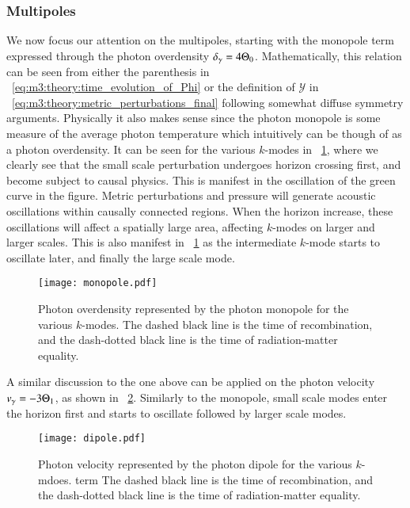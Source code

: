 \subsubsection{Multipoles}
    We now focus our attention on the multipoles, starting with the monopole term expressed through the photon overdensity $\delta_\gamma = 4\Theta_0$. Mathematically, this relation can be seen  from either the parenthesis in ~\cref{eq:m3:theory:time_evolution_of_Phi} or the definition of $\mathcal{Y}$ in ~\cref{eq:m3:theory:metric_perturbations_final} following somewhat diffuse symmetry arguments. Physically it also makes sense since the photon monopole is some measure of the average photon temperature which intuitively can be though of as a photon overdensity. It can be seen for the various $k$-modes in ~\cref{fig:m3:monopole}, where we clearly see that the small scale perturbation undergoes horizon crossing first, and become subject to causal physics. This is manifest in the oscillation of the green curve in the figure. Metric perturbations and pressure will generate acoustic oscillations within causally connected regions. When the horizon increase, these oscillations will affect a spatially large area, affecting $k$-modes on larger and larger scales. This is also manifest in ~\cref{fig:m3:monopole} as the intermediate $k$-mode starts to oscillate later, and finally the large scale mode. 
    \begin{figure}
        \texttt{[image: monopole.pdf]}
        \caption{Photon overdensity represented by the photon monopole for the various $k$-modes. The dashed black line is the time of recombination, and the dash-dotted black line is the time of radiation-matter equality.}
        \label{fig:m3:monopole}
    \end{figure}

    A similar discussion to the one above can be applied on the photon velocity $v_\gamma = -3\Theta_1$, as shown in ~\cref{fig:m3:dipole}. Similarly to the monopole, small scale modes enter the horizon first and starts to oscillate followed by larger scale modes. 

    \begin{figure}
        \texttt{[image: dipole.pdf]}
        \caption{Photon velocity represented by the photon dipole for the various $k$-mdoes. term The dashed black line is the time of recombination, and the dash-dotted black line is the time of radiation-matter equality.}
        \label{fig:m3:dipole}
    \end{figure}

